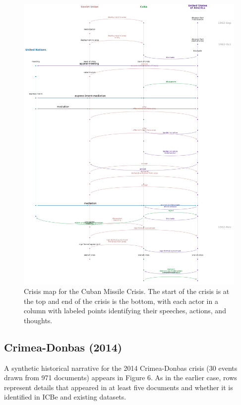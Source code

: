 \documentclass{article}
\begin{document}
\begin{figure}
\hypertarget{fig-cuba-crisismap}{%
\centering
\includegraphics[width=6in,height=\textheight]{p_196_icbe.png}
\caption{Crisis map for the Cuban Missile Crisis. The start of the
crisis is at the top and end of the crisis is the bottom, with each
actor in a column with labeled points identifying their speeches,
actions, and thoughts.}\label{fig-cuba-crisismap}
}
\end{figure}

\hypertarget{crimea-donbas-2014}{%
\subsection{Crimea-Donbas (2014)}\label{crimea-donbas-2014}}

A synthetic historical narrative for the 2014 Crimea-Donbas crisis (30
events drawn from 971 documents) appears in Figure 6. As in the earlier
case, rows represent details that appeared in at least five documents
and whether it is identified in ICBe and existing datasets.
\end{document}

